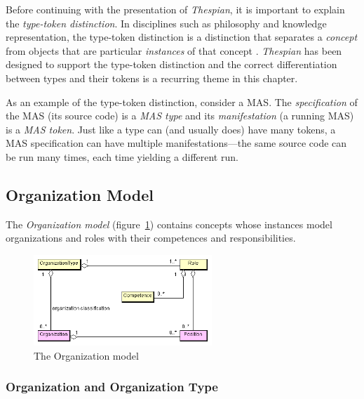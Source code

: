 Before continuing with the presentation of \textit{Thespian}, it is important to explain the \textit{type-token distinction}.
In disciplines such as philosophy and knowledge representation, the type-token distinction is a distinction that separates a \textit{concept} from objects that are particular \textit{instances} of that concept \cite{Wikipedia-TTD}.
\textit{Thespian} has been designed to support the type-token distinction and the correct differentiation between types and their tokens is a recurring theme in this chapter.

As an example of the type-token distinction, consider a MAS.
The \textit{specification} of the MAS (its source code) is a \textit{MAS type} and its \textit{manifestation} (a running MAS) is a \textit{MAS token}.
Just like a type can (and usually does) have many tokens, a MAS specification can have multiple manifestations---the same source code can be run many times, each time yielding a different run.

\subsection{Organization Model}

The \textit{Organization model} (figure~\ref{figure:thespian-organization-model}) contains concepts whose instances model organizations and roles with their competences and responsibilities.

\begin{figure}[ht]
	\centering
	\includegraphics[width=0.6\textwidth]{images/thespian/organization-model}
	\caption{The Organization model}
	\label{figure:thespian-organization-model}
\end{figure}

\subsubsection*{Organization and Organization Type}


